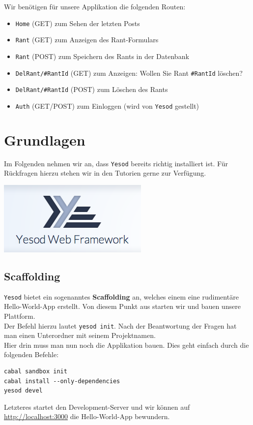 \documentclass{beamer}
\begin{document}
\begin{frame}[fragile]
Wir benötigen für unsere Applikation die folgenden Routen:\pause
\begin{itemize}
 \item \texttt{Home} (GET) zum Sehen der letzten Posts
 \pause
 \item \texttt{Rant} (GET) zum Anzeigen des Rant-Formulars
 \pause
 \item \texttt{Rant} (POST) zum Speichern des Rants in der Datenbank
 \pause
 \item \texttt{DelRant/\#RantId} (GET) zum Anzeigen: \glqq Wollen Sie Rant \texttt{\#RantId} löschen?\grqq
 \pause
 \item \texttt{DelRant/\#RantId} (POST) zum Löschen des Rants
 \pause
 \item \texttt{Auth} (GET/POST) zum Einloggen (wird von \texttt{Yesod} gestellt)
\end{itemize}

\end{frame}


\section{Grundlagen}

\begin{frame}
Im Folgenden nehmen wir an, dass \texttt{Yesod} bereits richtig installiert ist. Für Rückfragen hierzu stehen wir in den Tutorien gerne zur Verfügung.\bigskip

\begin{center}
\includegraphics[scale=0.75]{yesod.png} 
\end{center}
\end{frame}

\subsection{Scaffolding}

\begin{frame}[fragile]
\texttt{Yesod} bietet ein sogenanntes \textbf{Scaffolding} an, welches einem eine rudimentäre Hello-World-App erstellt. Von diesem Punkt aus starten wir und bauen unsere Plattform.\\\pause
Der Befehl hierzu lautet \texttt{yesod init}. Nach der Beantwortung der Fragen hat man einen Unterordner mit seinem Projektnamen.\\\pause
Hier drin muss man nun noch die Applikation bauen. Dies geht einfach durch die folgenden Befehle:
\begin{verbatim}
cabal sandbox init
cabal install --only-dependencies
yesod devel
\end{verbatim}
\pause
Letzteres startet den Development-Server und wir können auf \url{http://localhost:3000} die Hello-World-App bewundern.
\end{frame}
\end{document}
